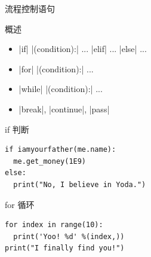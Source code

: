 \documentclass{beamer}
\begin{document}
    \begin{frame}[fragile]{流程控制语句}
      \begin{block}{概述}
        \begin{itemize}\small
          \item \cverb|if| \cverb|(condition):| ... \cverb|elif| ... \cverb|else| ...
          \item \cverb|for| \cverb|(condition):| ...
          \item \cverb|while| \cverb|(condition):| ...
          \item \cverb|break|, \cverb|continue|, \cverb|pass|
        \end{itemize}
      \end{block}
      \begin{exampleblock}{if 判断}
        \begin{lstlisting}
if iamyourfather(me.name):
  me.get_money(1E9)
else:
  print("No, I believe in Yoda.")
        \end{lstlisting}
      \end{exampleblock}
      \begin{exampleblock}{for 循环}
        \begin{lstlisting}
for index in range(10):
  print('Yoo! %d' %(index,))
print("I finally find you!")
        \end{lstlisting}
      \end{exampleblock}
    \end{frame}
\end{document}
